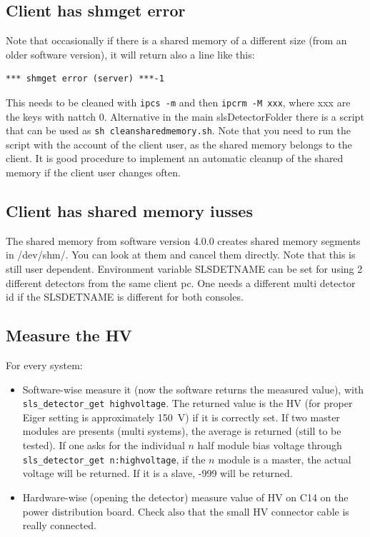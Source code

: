 \documentclass{article}
\begin{document}
{{{\subsection{Client has \textbf{shmget error}}
Note that occasionally if there is a shared memory of a different size (from an older software version), it will return also a line like this:
\begin{verbatim}
*** shmget error (server) ***-1
\end{verbatim}
This needs to be cleaned with {\tt{ipcs -m}} and then {\tt{ipcrm -M xxx}}, where xxx are the keys with nattch 0. Alternative in the main slsDetectorFolder there is a script that can be used as {\tt{sh cleansharedmemory.sh}}. Note that you need to run the script with the account of the client user, as the shared memory belongs to the client. It is good procedure to implement an automatic cleanup of the shared memory if the client user changes often.   

\subsection{Client has shared memory iusses}
The shared memory from software version 4.0.0 creates shared memory segments in /dev/shm/. You can look at them and cancel them directly. Note that this is still user dependent.
Environment variable SLSDETNAME can be set for using 2 different detectors from the same client pc. One needs a different multi detector id if the SLSDETNAME is different for both consoles.

\subsection{Measure the HV}
For every system: 
\begin{itemize}
\item Software-wise measure it (now the software returns the measured value), with {\tt{sls\_detector\_get highvoltage}}. The returned value is the HV (for proper Eiger setting is approximately 150~V) if it is correctly set. If two master modules are presents (multi systems), the average is returned (still to be tested). If one asks for the individual $n$ half module bias voltage through {\tt{sls\_detector\_get n:highvoltage}}, if the $n$ module is a master, the actual voltage will be returned. If it is a slave, -999 will be returned. 
\item Hardware-wise (opening the detector) measure value of HV on C14 on the power distribution board. Check also that the small HV connector cable is really connected. 
 \end{itemize}

}}}
\end{document}
